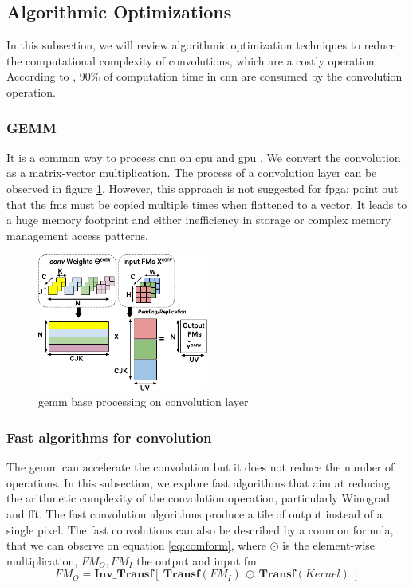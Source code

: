 \subsection{Algorithmic Optimizations} \label{subsec:algopti}
In this subsection, we will review algorithmic optimization techniques to reduce the computational complexity of convolutions, which are a costly operation. According to \cite{shawahna_fpga-based_2019}, 90\% of computation time in \acrshort{cnn} are consumed by the convolution operation.
%
%
\subsubsection{GEMM}
%
%
It is a common way to process \acrshort{cnn} on \acrshort{cpu} and \acrshort{gpu} \cite{abdelouahab_accelerating_2018}. We convert the convolution as a matrix-vector multiplication. The process of a convolution layer can be observed in figure \ref{fig:gemm}. However, this approach is not suggested for \acrshort{fpga}: \textcite{sze_efficient_2017, zhu_efficient_2020} point out that the \acrshort{fm}s must be copied multiple times when flattened to a vector. It leads to a huge memory footprint and either inefficiency in storage or complex memory management access patterns.
\begin{figure}
    \centering
    \includegraphics[width=0.5\textwidth]{Images/gemm.pdf}
    \caption{\acrshort{gemm} base processing on convolution layer \cite{abdelouahab_accelerating_2018}}
    \label{fig:gemm}
\end{figure}
%
%
\subsubsection{Fast algorithms for convolution}
The \acrshort{gemm} can accelerate the convolution but it does not reduce the number of operations. In this subsection, we explore fast algorithms that aim at reducing the arithmetic complexity of the convolution operation, particularly Winograd and \acrfull{fft}. The fast convolution algorithms produce a tile of output instead of a single pixel. The fast convolutions can also be described by a common formula, that we can observe on equation \ref{eq:comform}, where $\odot$ is the element-wise multiplication, $FM_O, FM_I$ the output and input \acrshort{fm}
\begin{equation}
FM_O = \boldsymbol{Inv\_Transf} [ \ \boldsymbol{Transf}(FM_I) \ \odot \ \boldsymbol{Transf}(Kernel) \ ]
\label{eq:comform}
\end{equation}
%
